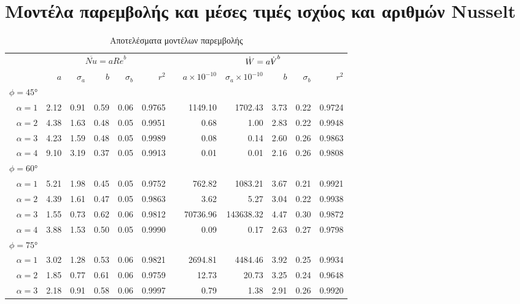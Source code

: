 \section{Μοντέλα παρεμβολής και μέσες τιμές ισχύος και αριθμών Nusselt}

\begin{table*}[!htbp]
\caption{Αποτελέσματα μοντέλων παρεμβολής}\label{tab:powerfits}
\centering
{}
\begin{adjustbox}{width=\textwidth}
\begin{tabular}{@{}rrrrrrcrrrrr@{}}\toprule
& \multicolumn{5}{c}{$\overline{Nu} = a{Re}^b$} & \phantom{abc} & \multicolumn{5}{c}{$\dot{W} = a\dot{\volume}^b$}\\
\cmidrule{2-6} \cmidrule{8-12}
& $a$ & $\sigma_a$ & $b$ & $\sigma_b$ & $r^2$ && $a \times 10^{-10}$ & $\sigma_a \times 10^{-10}$ & $b$ & $\sigma_b$ & $r^2$\\ \midrule
$\phi=\ang{45}$\\
$\alpha = 1$ & 2.12 &  0.91 &  0.59 &  0.06 & 0.9765 && 1149.10 & 1702.43 &  3.73 &  0.22 & 0.9724 \\ 
$\alpha = 2$ & 4.38 &  1.63 &  0.48 &  0.05 & 0.9951 &&  0.68 &  1.00 &  2.83 &  0.22 & 0.9948 \\ 
$\alpha = 3$ & 4.23 &  1.59 &  0.48 &  0.05 & 0.9989 &&  0.08 &  0.14 &  2.60 &  0.26 & 0.9863 \\ 
$\alpha = 4$ & 9.10 &  3.19 &  0.37 &  0.05 & 0.9913 &&  0.01 &  0.01 &  2.16 &  0.26 & 0.9808 \\ 
$\phi=\ang{60}$\\
$\alpha = 1$ & 5.21 &  1.98 &  0.45 &  0.05 & 0.9752 && 762.82 & 1083.21 &  3.67 &  0.21 & 0.9921 \\ 
$\alpha = 2$ & 4.39 &  1.61 &  0.47 &  0.05 & 0.9863 &&  3.62 &  5.27 &  3.04 &  0.22 & 0.9938 \\
$\alpha = 3$ & 1.55 &  0.73 &  0.62 &  0.06 & 0.9812 && 70736.96 & 143638.32 &  4.47 &  0.30 & 0.9872 \\ 
$\alpha = 4$ & 3.88 &  1.53 &  0.50 &  0.05 & 0.9990 &&  0.09 &  0.17 &  2.63 &  0.27 & 0.9798 \\
$\phi=\ang{75}$\\
$\alpha = 1$ & 3.02 &  1.28 &  0.53 &  0.06 & 0.9821 && 2694.81 & 4484.46 &  3.92 &  0.25 & 0.9934 \\ 
$\alpha = 2$ & 1.85 &  0.77 &  0.61 &  0.06 & 0.9759 && 12.73 & 20.73 &  3.25 &  0.24 & 0.9648 \\ 
$\alpha = 3$ & 2.18 &  0.91 &  0.58 &  0.06 & 0.9997 &&  0.79 &  1.38 &  2.91 &  0.26 & 0.9920 \\ 

\end{tabular}
\end{adjustbox}
\end{table*}
